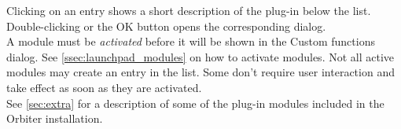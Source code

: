 \documentclass[Orbiter User Manual.tex]{subfiles}
\begin{document}
\begin{figure}[H]
	\centering
\end{figure}

\noindent
Clicking on an entry shows a short description of the plug-in below the list. Double-clicking or the OK button opens the corresponding dialog.\\
A module must be \textit{activated} before it will be shown in the Custom functions dialog. See \ref{ssec:launchpad_modules} on how to activate modules. Not all active modules may create an entry in the list. Some don’t require user interaction and take effect as soon as they are activated.\\
See \ref{sec:extra} for a description of some of the plug-in modules included in the Orbiter installation.
\end{document}
